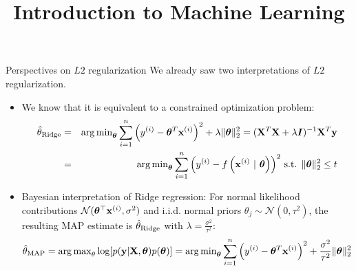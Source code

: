 \documentclass[11pt,compress,t,notes=noshow, xcolor=table]{beamer}
\title{Introduction to Machine Learning}
\date{}
\begin{document}



\begin{vbframe}{Perspectives on $L2$ regularization}
We already saw two interpretations of $L2$ regularization. 
\begin{itemize}
    \item We know that it is equivalent to a constrained optimization problem:
  \begin{eqnarray*}  
  \hat{\theta}_{\text{Ridge}} &=& \operatorname{arg\,min}_{\bm{\theta}} \sum\limits_{i=1}^n \left(y^{(i)} - \bm{\theta}^T \mathbf{x}^{(i)} \right)^2 + \lambda \|\bm{\theta}\|_2^2 = ({\mathbf{X}}^T \mathbf{X}  + \lambda \boldsymbol{I})^{-1} \mathbf{X}^T\mathbf{y}\\
  &=& \operatorname{arg\,min}_{\bm{\theta}} \sum\limits_{i=1}^n \left(y^{(i)} - f\left(\mathbf{x}^{(i)} ~|~ \bm{\theta}\right)\right)^2 \,
  \text{s.t. } \|\bm{\theta}\|_2^2  \leq t
  \end{eqnarray*}
  \item Bayesian interpretation of Ridge regression: For normal likelihood contributions $\mathcal{N}(\bm{\theta}^{\top}\mathbf{x}^{(i)},\sigma^2)$ and i.i.d. normal priors $\theta_j \sim \mathcal{N}(0,\tau^{2})$, the resulting MAP estimate is $\hat{\theta}_{\text{Ridge}}$ with $\lambda=\frac{\sigma^2}{\tau^2}$:
  $$\hat{\theta}_{\text{MAP}}=\operatorname{arg\,max}_{\theta} \log[p(\mathbf{y}|\mathbf{X},\bm{\theta})p(\bm{\theta})] = \operatorname{arg\,min}_{\bm{\theta}} \sum\limits_{i=1}^n \left(y^{(i)} - \bm{\theta}^T \mathbf{x}^{(i)} \right)^2 + \frac{\sigma^2}{\tau^2} \|\bm{\theta}\|_2^2$$
\end{itemize}

\end{vbframe}
\end{document}
